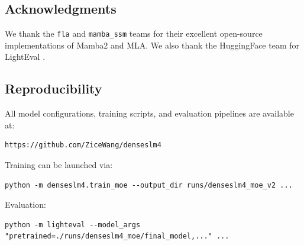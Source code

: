 \subsection*{Acknowledgments}

We thank the \texttt{fla} \citep{fla} and \texttt{mamba\_ssm} teams for their excellent open-source implementations of Mamba2 and MLA. We also thank the HuggingFace team for LightEval \citep{lighteval}.

\subsection*{Reproducibility}

All model configurations, training scripts, and evaluation pipelines are available at:
\begin{verbatim}
https://github.com/ZiceWang/denseslm4
\end{verbatim}

Training can be launched via:
\begin{verbatim}
python -m denseslm4.train_moe --output_dir runs/denseslm4_moe_v2 ...
\end{verbatim}

Evaluation:
\begin{verbatim}
python -m lighteval --model_args "pretrained=./runs/denseslm4_moe/final_model,..." ...
\end{verbatim}
